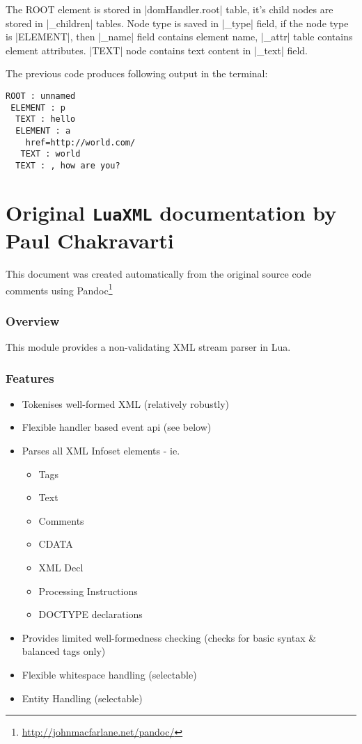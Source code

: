 \documentclass{ltxdoc}
\begin{document}
The ROOT element is stored in |domHandler.root| table, it's child nodes are stored in |_children|
tables. Node type is saved in |_type| field, if the node type is |ELEMENT|, then |_name| field contains 
element name, |_attr| table contains element attributes. |TEXT| node contains text content in |_text| 
field.

The previous code produces following output in the terminal: %

\begin{verbatim}
ROOT : unnamed
 ELEMENT : p
  TEXT : hello
  ELEMENT : a
    href=http://world.com/
   TEXT : world
  TEXT : , how are you?
\end{verbatim}



\clearpage
\part{Original \texttt{LuaXML} documentation by Paul Chakravarti}
\medskip

\noindent This document was created automatically from the original source code comments using Pandoc\footnote{\url{http://johnmacfarlane.net/pandoc/}} 

\section{Overview}


This module provides a non-validating XML stream parser in Lua. 
\section{Features}

\begin{itemize}
\item
  Tokenises well-formed XML (relatively robustly)
\item
  Flexible handler based event api (see below)
\item
  Parses all XML Infoset elements - ie.
  \begin{itemize}
  \item
    Tags
  \item
    Text
  \item
    Comments
  \item
    CDATA
  \item
    XML Decl
  \item
    Processing Instructions
  \item
    DOCTYPE declarations
  \end{itemize}
\item
  Provides limited well-formedness checking (checks for basic syntax \&
  balanced tags only)
\item
  Flexible whitespace handling (selectable)
\item
  Entity Handling (selectable)
\end{itemize}
\end{document}
